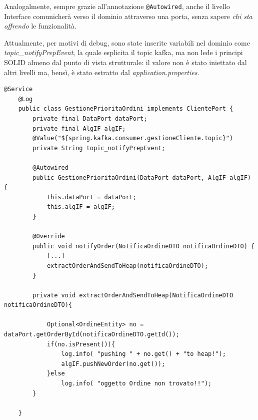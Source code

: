 Analogalmente, sempre grazie all'annotazione \texttt{@Autowired}, anche il livello Interface comunicherà verso il dominio attraverso una porta, senza sapere \textit{chi sta offrendo} le funzionalità.

Attualmente, per motivi di debug, sono state inserite variabili nel dominio come \textit{topic\_notifyPrepEvent}, la quale esplicita il topic kafka, ma non lede i principi SOLID almeno dal punto di vista strutturale: il valore non è stato iniettato dal altri livelli ma, bensì, è stato estratto dal \textit{application.properties}.

\begin{lstlisting}[style=myJava, caption={classe GestionePrioritàOrdini.java nel dominio di GestioneComanda}, label=lst:GestioenPrioritaOrdiniClass]
    @Service
    @Log
    public class GestionePrioritaOrdini implements ClientePort {
        private final DataPort dataPort;
        private final AlgIF algIF;
        @Value("${spring.kafka.consumer.gestioneCliente.topic}")
        private String topic_notifyPrepEvent;
    
        @Autowired
        public GestionePrioritaOrdini(DataPort dataPort, AlgIF algIF) {
            this.dataPort = dataPort;
            this.algIF = algIF;
        }
    
        @Override
        public void notifyOrder(NotificaOrdineDTO notificaOrdineDTO) {
            [...]
            extractOrderAndSendToHeap(notificaOrdineDTO);
        }
    
        private void extractOrderAndSendToHeap(NotificaOrdineDTO notificaOrdineDTO){
    
            Optional<OrdineEntity> no = dataPort.getOrderById(notificaOrdineDTO.getId());
            if(no.isPresent()){
                log.info( "pushing " + no.get() + "to heap!");
                algIF.pushNewOrder(no.get());
            }else
                log.info( "oggetto Ordine non trovato!!");
        }
    
    }
\end{lstlisting}


\clearpage
